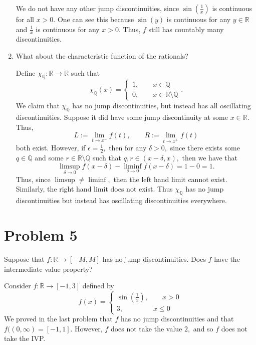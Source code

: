\documentclass[11pt]{article}
\newcommand{\bbQ}{\mathbb{Q}}
\newcommand{\bbR}{\mathbb{R}}
\newcommand{\sm}{\setminus}
\begin{document}
\begin{enumerate}
\begin{solution}
        We do not have any other jump discontinuities, since $\sin(\frac{1}{x})$ is continuous for all $x>0.$ One can see this because $\sin(y)$ is continuous for any $y\in \bbR$ and $\frac{1}{x}$ is continuous for any $x>0.$ Thus, $f$ still has countably many discontinuities.
    \end{solution}
    \item 
    \begin{problem}
        What about the characteristic function of the rationals?
    \end{problem}
    \begin{solution}
        Define $\chi_\bbQ: \bbR \to \bbR$ such that 
        \[\chi_\bbQ(x) = 
        \begin{cases}
        1, \qquad x\in \bbQ\\
        0, \qquad x\in \bbR \sm \bbQ
        \end{cases}.\] We claim that $\chi_\bbQ$ has no jump discontinuities, but instead has all oscillating discontinuities. Suppose it did have some jump discontinuity at some $x\in \bbR.$ Thus, \[L:= \lim_{t\to x^-}f(t), \qquad R:= \lim_{t\to x^+}f(t)\] both exist. However, if $\epsilon = \frac{1}{2},$ then for any $\delta>0,$ since there exists some $q\in \bbQ$ and some $r\in \bbR\sm \bbQ$ such that $q,r \in (x-\delta, x),$ then we have that
        \[\limsup_{\delta \to 0}f(x-\delta) - \liminf_{\delta \to 0}f(x-\delta) = 1-0 =1.\] Thus, since $\limsup\neq \liminf,$ then the left hand limit cannot exist. Similarly, the right hand limit does not exist. Thus $\chi_\bbQ$ has no jump discontinuities but instead has oscillating discontinuities everywhere.
    \end{solution}
\end{enumerate}

\newpage
\section*{Problem 5}
\begin{problem}
    Suppose that $f : \bbR \to [-M,M]$ has no jump discontinuities. Does $f$ have the intermediate value property?
\end{problem}
\begin{solution}
    Consider $f: \bbR \to [-1,3]$ defined by 
    \[f(x) = 
    \begin{cases}
            \sin(\frac{1}{x}),\qquad x>0\\
            3, \qquad \; \qquad x\leq 0
        \end{cases}
    \]
    We proved in the last problem that $f$ has no jump discontinuities and that $f((0,\infty) = [-1,1].$ However, $f$ does not take the value $2,$ and so $f$ does not take the IVP.
\end{solution}
\end{document}
